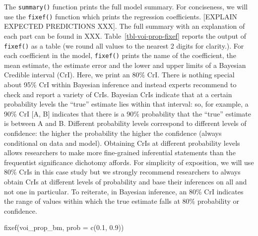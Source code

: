 \documentclass[
  authoryear,
  preprint,
  3p]{elsarticle}
\newenvironment{Shaded}{\begin{snugshade}}{\end{snugshade}}
\newcommand{\AttributeTok}[1]{\textcolor[rgb]{0.40,0.45,0.13}{#1}}
\newcommand{\FloatTok}[1]{\textcolor[rgb]{0.68,0.00,0.00}{#1}}
\newcommand{\FunctionTok}[1]{\textcolor[rgb]{0.28,0.35,0.67}{#1}}
\newcommand{\NormalTok}[1]{\textcolor[rgb]{0.00,0.23,0.31}{#1}}
\begin{document}
The \texttt{summary()} function prints the full model summary. For
conciseness, we will use the \texttt{fixef()} function which prints the
regression coefficients. {[}EXPLAIN EXPECTED PREDICTIONS XXX{]}. The
full summary with an explanation of each part can be found in XXX.
Table~\ref{tbl-voi-prop-fixef} reports the output of \texttt{fixef()} as
a table (we round all values to the nearest 2 digits for clarity.). For
each coefficient in the model, \texttt{fixef()} prints the name of the
coefficient, the mean estimate, the estimate error and the lower and
upper limits of a Bayesian Credible interval (CrI). Here, we print an
80\% CrI. There is nothing special about 95\% CrI within Bayesian
inference and instead experts recommend to check and report a variety of
CrIs. Bayesian CrIs indicate that at a certain probability levels the
``true'' estimate lies within that interval: so, for example, a 90\% CrI
{[}A, B{]} indicates that there is a 90\% probability that the ``true''
estimate is between A and B. Different probability levels correspond to
different levels of confidence: the higher the probability the higher
the confidence (always conditional on data and model). Obtaining CrIs at
different probability levels allows researchers to make more
fine-grained inferential statements than the frequentist significance
dichotomy affords. For simplicity of exposition, we will use 80\% CrIs
in this case study but we strongly recommend researchers to always
obtain CrIs at different levels of probability and base their inferences
on all and not one in particular. To reiterate, in Bayesian inference,
an 80\% CrI indicates the range of values within which the true estimate
falls at 80\% probability or confidence.

\begin{Shaded}
\begin{Highlighting}[]
\FunctionTok{fixef}\NormalTok{(voi\_prop\_bm, }\AttributeTok{prob =} \FunctionTok{c}\NormalTok{(}\FloatTok{0.1}\NormalTok{, }\FloatTok{0.9}\NormalTok{))}
\end{Highlighting}
\end{Shaded}
\end{document}
